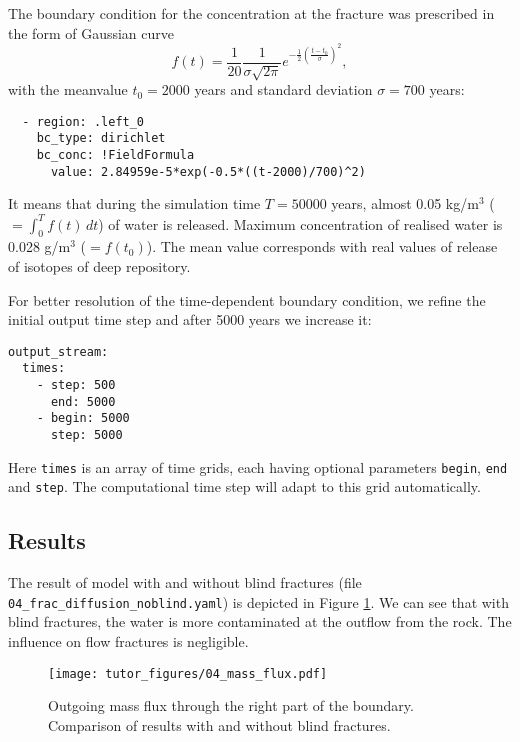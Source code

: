 The boundary condition for the concentration at the fracture was
prescribed in the form of Gaussian curve
\[ f(t) = \frac1{20} \frac{1}{\sigma\sqrt{2\pi}}e^{-\frac12\left(\frac{t-t_0}{\sigma}\right)^2}, \]
with the meanvalue \(t_0=2000\) years and standard deviation
\(\sigma=700\) years:

\begin{verbatim}
  - region: .left_0
    bc_type: dirichlet
    bc_conc: !FieldFormula
      value: 2.84959e-5*exp(-0.5*((t-2000)/700)^2)
\end{verbatim}

It means that during the simulation time \(T=50000\) years, almost 0.05
kg/m\(^3\) (\(=\int_0^Tf(t)\,dt\)) of water is released. Maximum
concentration of realised water is 0.028 g/m\(^3\) (\(=f(t_0)\)). The
mean value corresponds with real values of release of isotopes of deep
repository.

For better resolution of the time-dependent boundary condition, we
refine the initial output time step and after 5000 years we increase it:

\begin{verbatim}
output_stream:
  times:
    - step: 500
      end: 5000
    - begin: 5000
      step: 5000
\end{verbatim}

Here \texttt{times} is an array of time grids, each having optional
parameters \texttt{begin}, \texttt{end} and \texttt{step}. The
computational time step will adapt to this grid automatically.

\subsection{Results}\label{results}

The result of model with and without blind fractures (file
\texttt{04\_frac\_diffusion\_noblind.yaml}) is depicted in Figure
\ref{fig:diff_res}. We can see that with blind fractures, the water is
more contaminated at the outflow from the rock. The influence on flow
fractures is negligible.

\begin{figure}[htbp]
\centering
\texttt{[image: tutor\_figures/04\_mass\_flux.pdf]}
\caption{Outgoing mass flux through the right part of the boundary.
Comparison of results with and without blind
fractures.\label{fig:diff_res}}
\end{figure}
